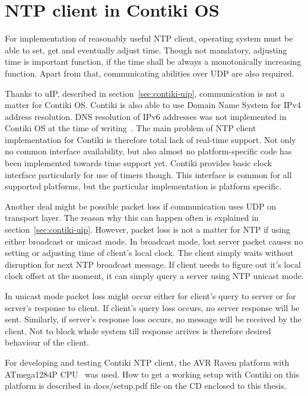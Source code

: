 
\chapter{NTP client in Contiki OS}
For implementation of reasonably useful NTP client,
operating system must be able to set, get
and eventually adjust time.
Though not mandatory, adjusting time is important function,
if the time shall be always a monotonically increasing function.
Apart from that, communicating abilities over UDP are also required.

Thanks to uIP, described in section~\ref{sec:contiki-uip}, communication is
not a matter for Contiki OS.
Contiki is also able to use Domain Name System for IPv4 address resolution.
DNS resolution of IPv6 addresses was not implemented in Contiki OS
at the time of writing~\cite{contiki-docs}.
The main problem of NTP client implementation for Contiki is therefore total
lack of real-time support.
Not only no common interface availability, but also
almost no platform-specific code has been implemented towards time support yet.
Contiki provides basic clock interface particularly for use of timers though.
This interface is common for all supported platforms,
but the particular implementation is platform specific.

Another deal might be possible packet loss if communication uses UDP on transport layer.
The reason why this can happen often is explained in section~\ref{sec:contiki-uip}.
However, packet loss is not a matter for NTP if using either broadcast or unicast mode.
In broadcast mode, lost server packet causes no setting or adjusting time of client's
local clock.
The client simply waits without disruption for next NTP broadcast message.
If client needs to figure out it's local clock offset at the moment,
it can simply query a server using NTP unicast mode.

In unicast mode packet loss might occur either for client's query to server
or for server's response to client.
If client's query loss occurs, no server response will be sent.
Similarly, if server's response loss occurs, no message will be received by the client.
Not to block whole system till response arrives
is therefore desired behaviour of the client.


For developing and testing Contiki NTP client,
the AVR Raven platform with ATmega1284P CPU~\cite{avr-datasheet} was used.
How to get a working setup with Contiki on this platform is described in
docs/setup.pdf file on the CD enclosed to this thesis.








